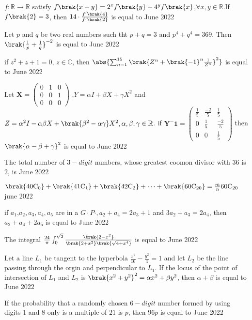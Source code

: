\iffalse
\title{Assignment 3}
\author{AI24BTECH11018}
\section{integer}
\fi

\item $f: \mathbb{R} \to \mathbb{R}$ satisfy $f\brak{x+y}=2^xf\brak{y}+4^yf\brak{x}$,$\forall x,  y \in \mathbb{R}$.If $f\brak{2}=3$, then $14\cdot \frac{f^{\prime}\brak{4}}{f^{\prime}\brak{2}}$ is equal to 
\hfill{June 2022}
    \item Let $p$ and $q$ be two real numbers such tht $p+q=3$
and $p^4+q^4=369$. Then $\brak{\frac{1}{p}+\frac{1}{q}}^{-2}$ is equal to 
\hfill{June 2022}
\item if $z^2+z+1=0$, $z \in \mathbb{C}$, then $\abs{\sum_{n=1}^{15}\brak{Z^n+{\brak{-1}^n\frac{1}{Z^n}}}^2}$ is equal to
\hfill{June 2022} 
\item Let $\mathbf{X} = \begin{pmatrix}
0 & 1 & 0 \\
0 & 0 & 1 \\
0 & 0 & 0
\end{pmatrix}$ ,$Y=\alpha I+\beta X+\gamma X^2$ and $Z={\alpha^2}I-\alpha \beta X+\brak{{\beta^2}-\alpha \gamma}X^2,\alpha ,\beta ,\gamma \in \mathbb{R}$. if $\mathbf{Y^-1} = \begin{pmatrix}
\frac{1}{5} & \frac{-2}{5} & \frac{1}{5} \\
0 & \frac{1}{5} & \frac{-2}{5} \\
0 & 0 & \frac{1}{5}
\end{pmatrix}$ then $\brak{\alpha -\beta +\gamma}^2$ is equal to
\hfill{June 2022} 
\item The total number of $3-digit$ numbers, whose greatest coomon divisor with $36$ is $2$, is
\hfill{June 2022} 
\item $\brak{\mathrm{40C_0}}+\brak{\mathrm{41C_1}}+\brak{\mathrm{42C_2}}+\cdots +\brak{\mathrm{60C_{20}}}=\frac{m}{n}\mathrm{60C_{20}}$
\hfill{june 2022}
\item if $a_1$,$a_2,a_3,a_4,a_5$ are in a $G\cdot P\cdot ,a_2+a_4=2a_3+1$ and $3a_2+a_3=2a_4$, then $a_2+a_4+2a_5$ is equal to
\hfill{June 2022} 
\item The integral $\frac{24}{\pi}\int_{0}^{\sqrt{2}}\frac{\brak{2-x^2}}{\brak{2+x^2}\brak{\sqrt{4+x^4}}}$ is equal to 
\hfill{June 2022}
\item Let a line $L_1$ be tangent to the hyperbola $\frac{x^2}{16}-\frac{y^2}{4}=1$ and let $L_2$ be the line passing through the orgin and perpendicular to $L_1$. If the locus of the point of intersection of $L_1$ and $L_2$ is $\brak{x^2+y^2}^2=\alpha x^2+\beta y^2$, then $\alpha + \beta $ is equal to 
\hfill{June 2022}
\item If the probability that a randomly chosen $6-digit$ number formed by using digits $1$ and $8$ only is a multiple of $21$ is $p$, then $96 p$ is equal to 
\hfill{June 2022}

%
